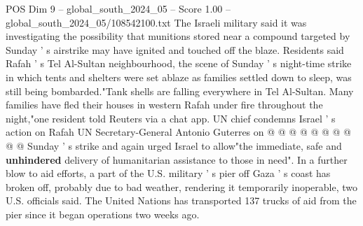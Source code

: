 \begin{textsample}{POS Dim 9 – global\_south\_2024\_05 – Score 1.00 – global\_south\_2024\_05/108542100.txt}
The Israeli military said it was investigating the possibility that munitions stored near a compound targeted by Sunday ' s airstrike may have ignited and touched off the blaze.
Residents said Rafah ' s Tel Al-Sultan neighbourhood, the scene of Sunday ' s night-time strike in which tents and shelters were set ablaze as families settled down to sleep, was still being bombarded."Tank shells are falling everywhere in Tel Al-Sultan.
Many families have fled their houses in western Rafah under fire throughout the night,"one resident told Reuters via a chat app.
UN chief condemns Israel ' s action on Rafah UN Secretary-General Antonio Guterres on @ @ @ @ @ @ @ @ @ @ Sunday ' s strike and again urged Israel to allow"the immediate, safe and \textbf{unhindered} delivery of humanitarian assistance to those in need".
In a further blow to aid efforts, a part of the U.S. military ' s pier off Gaza ' s coast has broken off, probably due to bad weather, rendering it temporarily inoperable, two U.S. officials said.
The United Nations has transported 137 trucks of aid from the pier since it began operations two weeks ago.

\end{textsample}
